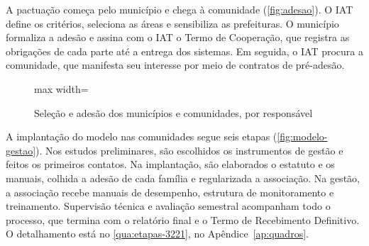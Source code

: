 A pactuação começa pelo município e chega à comunidade
(\autoref{fig:adesao}). O IAT define os critérios, seleciona as áreas e
sensibiliza as prefeituras. O município formaliza a adesão e assina com o IAT o
Termo de Cooperação, que registra as obrigações de cada parte até a entrega
dos sistemas. Em seguida, o IAT procura a comunidade, que manifesta seu
interesse por meio de contratos de pré-adesão.

\begin{figure}[H]
  \centering
  \caption{Seleção e adesão dos municípios e comunidades, por responsável}
  \label{fig:adesao}
  \begin{adjustbox}{max width=\linewidth}
  \end{adjustbox}
\end{figure}

A implantação do modelo nas comunidades segue seis etapas
(\autoref{fig:modelo-gestao}). Nos estudos preliminares, são escolhidos os
instrumentos de gestão e feitos os primeiros contatos. Na implantação, são
elaborados o estatuto e os manuais, colhida a adesão de cada família e
regularizada a associação. Na gestão, a associação recebe manuais de
desempenho, estrutura de monitoramento e treinamento. Supervisão técnica e
avaliação semestral acompanham todo o processo, que termina com o relatório
final e o Termo de Recebimento Definitivo. O detalhamento está no
\autoref{qua:etapas-3221}, no Apêndice~\ref{ap:quadros}.

